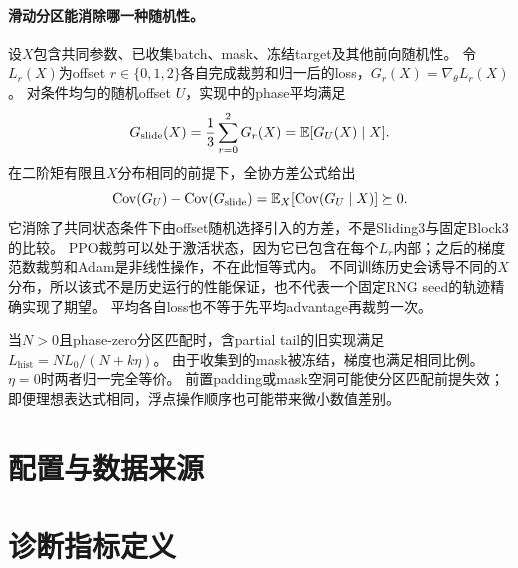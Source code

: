 \paragraph{滑动分区能消除哪一种随机性。}
设$X$包含共同参数、已收集batch、mask、冻结target及其他前向随机性。
令$L_r(X)$为offset $r\in\{0,1,2\}$各自完成裁剪和归一后的loss，$G_r(X)=\nabla_\theta L_r(X)$。
对条件均匀的随机offset $U$，实现中的phase平均满足
\begin{equation}
 G_{\mathrm{slide}}(X)=\frac13\sum_{r=0}^2G_r(X)=\mathbb{E}[G_U(X)\mid X].
\end{equation}
在二阶矩有限且$X$分布相同的前提下，全协方差公式给出
\begin{equation}
 \operatorname{Cov}(G_U)-\operatorname{Cov}(G_{\mathrm{slide}})=\mathbb{E}_X[\operatorname{Cov}(G_U\mid X)]\succeq0.
 \label{eq:phasecov}
\end{equation}
它消除了共同状态条件下由offset随机选择引入的方差，不是Sliding3与固定Block3的比较。
PPO裁剪可以处于激活状态，因为它已包含在每个$L_r$内部；之后的梯度范数裁剪和Adam是非线性操作，不在此恒等式内。
不同训练历史会诱导不同的$X$分布，所以该式不是历史运行的性能保证，也不代表一个固定RNG seed的轨迹精确实现了期望。
平均各自loss也不等于先平均advantage再裁剪一次。

当$N>0$且phase-zero分区匹配时，含partial tail的旧实现满足$L_{\mathrm{hist}}=N L_0/(N+k\eta)$。
由于收集到的mask被冻结，梯度也满足相同比例。$\eta=0$时两者归一完全等价。
前置padding或mask空洞可能使分区匹配前提失效；即便理想表达式相同，浮点操作顺序也可能带来微小数值差别。

\section{配置与数据来源}
\label{app:config}


\section{诊断指标定义}
\label{app:diagnostics}


